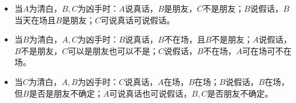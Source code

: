 \documentclass[a4paper, 11pt]{article}
\begin{document}
\begin{answer}
\begin{itemize}
    \begin{itemize}
        \item 当$A$为清白，$B,C$为凶手时：$A$说真话，$B$是朋友，$C$不是朋友；$B$说假话，$B$当天在场且$B$是朋友；$C$可说真话可说假话。
        \item 当$B$为清白，$A,C$为凶手时：$B$说真话，$B$不在场，且$B$不是朋友；$A$说假话，$B$不是朋友，$C$可以是朋友也可以不是；$C$说假话，$B$不在场，$A$可在场可不在场。
        \item 当$C$为清白，$A,B$为凶手时：$C$说真话，$A$在场，$B$在场；$B$说假话，$B$在场，但$B$是否是朋友不确定；$A$可说真话也可说假话，$B,C$是否朋友不确定。
    \end{itemize}
\end{itemize}
\end{answer}
\end{document}

